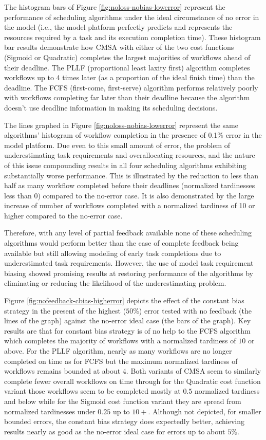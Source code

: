 \documentclass[10pt]{csce}
\begin{document}
The histogram bars of Figure \ref{fig:noloss-nobias-lowerror} represent the
performance of scheduling algorithms under the ideal circumstance of no error
in the model (i.e., the model platform perfectly predicts and represents the
resources required by a task and its execution completion time).  These
histogram bar results demonstrate how CMSA with either of the two
cost functions (Sigmoid or Quadratic) completes the largest majorities of
workflows ahead of their deadline.  The PLLF (proportional least laxity first)
algorithm completes workflows up to 4 times later (as a proportion of the
ideal finish time) than the deadline. The FCFS (first-come, first-serve)
algorithm performs relatively poorly with workflows completing far later than
their deadline because the algorithm doesn't use deadline information in making
its scheduling decisions.

The lines graphed in Figure \ref{fig:noloss-nobias-lowerror} represent the
same algorithms' histogram of workflow completion in the presence of 0.1\% error
in the model platform.  Due even to this small amount of error, the problem of
underestimating task requirements and overallocating resources, and the nature
of this issue compounding results in all four scheduling algorithms exhibiting
substantially worse performance.  This is illustrated by the reduction to less
than half as many workflow completed before their deadlines (normalized
tardinesses less than 0) compared to the no-error case.  It is also
demonstrated by the large increase of number of workflows completed with a
normalized tardiness of 10 or higher compared to the no-error case.

Therefore, with any level of partial feedback available none of these
scheduling algorithms would perform better than the case of
complete feedback being available but still allowing modeling of early task
completions due to underestimated task requirements.  However, the use of
model task requirement biasing showed promising results at restoring
performance of the algorithms by eliminating or reducing the likelihood of
the underestimating problem.

Figure \ref{fig:nofeedback-cbias-higherror} depicts the effect of the constant
bias strategy in the present of the highest ($50\%$) error tested with no
feedback (the lines of the graph) against the no-error ideal case (the bars
of the graph).  Key results are that for constant bias strategy is of no
help to the FCFS algorithm which completes the majority of workflows with a
normalized tardiness of $10$ or above.  For the PLLF algorithm, nearly as
many workflows are no longer completed on time as for FCFS but the maximum
normalized tardiness of workflows remains bounded at about $4$.  Both
variants of CMSA seem to similarly complete fewer overall workflows on time
through for the Quadratic cost function variant those workflows seem to be
completed mostly at $0.5$ normalized tardiness and below while for the
Sigmoid cost function variant they are spread from normalized tardinesses
under $0.25$ up to $10+$. Although not depicted, for smaller bounded errors,
the constant bias strategy does expectedly better, achieving results nearly
as good as the no-error ideal case for errors up to about $5\%$.
\end{document}
